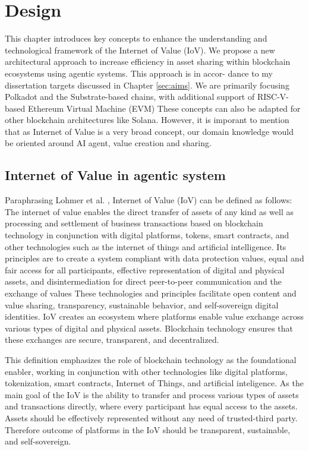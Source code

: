 \section{Design} \label{sec:design2}
This chapter introduces key concepts to enhance the understanding and technological framework of the Internet of Value (IoV). We propose a new architectural approach to increase efficiency in asset sharing within blockchain ecosystems using agentic systems. This approach is in accor-
dance to my dissertation targets discussed in Chapter \ref{sec:aims}.
We are primarily focusing Polkadot and the Substrate-based chains, with additional support of RISC-V-based Ethereum Virtual Machine (EVM) These concepts can also be adapted for other blockchain architectures like Solana. However, it is imporant to mention that as  Internet of Value is a very broad concept, our domain knowledge would be oriented around AI agent, value creation and sharing.

\subsection{Internet of Value in agentic system}

Paraphrasing Lohmer et al. \cite{Lohmer2024}, Internet of Value (IoV) can be defined as follows:
The internet of value enables the direct transfer of assets of any kind as well as processing and settlement of business transactions based on blockchain technology in conjunction with digital platforms, tokens, smart contracts, and other technologies such as the internet of things and artificial intelligence.
Its principles are to create a system compliant with data protection values, equal and fair access for all participants, effective representation of digital and physical assets, and disintermediation for direct peer-to-peer communication and the exchange of values
These technologies and principles facilitate open content and value sharing, transparency, sustainable behavior, and self-sovereign digital identities.
IoV creates an ecosystem where platforms enable value exchange across various types of digital and physical assets. Blockchain technology ensures that these exchanges are secure, transparent, and decentralized.

This definition emphasizes the role of blockchain technology as the foundational enabler, working in conjunction with other technologies like digital platforms, tokenization, smart contracts, Internet of Things, and artificial inteligence. As the main goal of the IoV is the ability to transfer and process various types of assets and transactions directly, where every participant has equal access to the assets. Assets should be effectively represented without any need of trusted-third party. Therefore outcome of platforms in the IoV should be transparent, sustainable, and self-sovereign.

